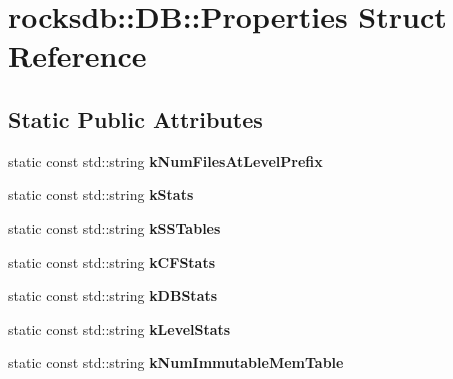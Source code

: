 \hypertarget{structrocksdb_1_1DB_1_1Properties}{}\section{rocksdb\+:\+:DB\+:\+:Properties Struct Reference}
\label{structrocksdb_1_1DB_1_1Properties}
\subsection*{Static Public Attributes}
\begin{DoxyCompactItemize}
\item 
static const std\+::string {\bfseries k\+Num\+Files\+At\+Level\+Prefix}\hypertarget{structrocksdb_1_1DB_1_1Properties_abe653893712dc310cdc5d37afde1404d}{}\label{structrocksdb_1_1DB_1_1Properties_abe653893712dc310cdc5d37afde1404d}

\item 
static const std\+::string {\bfseries k\+Stats}\hypertarget{structrocksdb_1_1DB_1_1Properties_a8d19649d9d1251d214a30643cc950e6e}{}\label{structrocksdb_1_1DB_1_1Properties_a8d19649d9d1251d214a30643cc950e6e}

\item 
static const std\+::string {\bfseries k\+S\+S\+Tables}\hypertarget{structrocksdb_1_1DB_1_1Properties_a4a704e886c572a3016786cc9b9a713a7}{}\label{structrocksdb_1_1DB_1_1Properties_a4a704e886c572a3016786cc9b9a713a7}

\item 
static const std\+::string {\bfseries k\+C\+F\+Stats}\hypertarget{structrocksdb_1_1DB_1_1Properties_a75c576e178fafe9c75c8f16c28562a9b}{}\label{structrocksdb_1_1DB_1_1Properties_a75c576e178fafe9c75c8f16c28562a9b}

\item 
static const std\+::string {\bfseries k\+D\+B\+Stats}\hypertarget{structrocksdb_1_1DB_1_1Properties_ad965d683e36095ed5b3b3143657938f7}{}\label{structrocksdb_1_1DB_1_1Properties_ad965d683e36095ed5b3b3143657938f7}

\item 
static const std\+::string {\bfseries k\+Level\+Stats}\hypertarget{structrocksdb_1_1DB_1_1Properties_a19884b12c9ec61d0a165e01540d8e0a4}{}\label{structrocksdb_1_1DB_1_1Properties_a19884b12c9ec61d0a165e01540d8e0a4}

\item 
static const std\+::string {\bfseries k\+Num\+Immutable\+Mem\+Table}\hypertarget{structrocksdb_1_1DB_1_1Properties_a1170040f6b53207276b78857afb17f73}{}\label{structrocksdb_1_1DB_1_1Properties_a1170040f6b53207276b78857afb17f73}


\end{DoxyCompactItemize}
